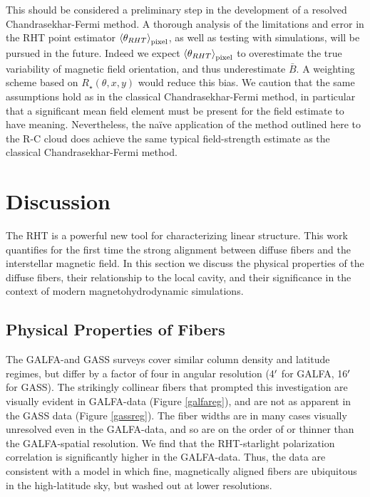 This should be considered a preliminary step in the development of a resolved Chandrasekhar-Fermi method. A thorough analysis of the limitations and error in the RHT point estimator $\left<\theta_{RHT}\right>_{\rm pixel}$, as well as testing with simulations, will be pursued in the future. Indeed we expect $\left<\theta_{RHT}\right>_{\rm pixel}$ to overestimate the true variability of magnetic field orientation, and thus underestimate $\bar{B}$. A weighting scheme based on $R_\star\left(\theta, x, y\right)$ would reduce this bias. We caution that the same assumptions hold as in the classical Chandrasekhar-Fermi method, in particular that a significant mean field element must be present for the field estimate to have meaning. Nevertheless, the na\"ive application of the method outlined here to the R-C cloud does achieve the same typical field-strength estimate as the classical Chandrasekhar-Fermi method.

\section{Discussion}\label{discussion}
The RHT is a powerful new tool for characterizing linear structure. This work quantifies for the first time the strong alignment between diffuse \hi fibers and the interstellar magnetic field. In this section we discuss the physical properties of the diffuse fibers, their relationship to the local cavity, and their significance in the context of modern magnetohydrodynamic simulations.

\subsection{Physical Properties of Fibers}
The GALFA-\hi and GASS surveys cover similar column density and latitude regimes, but differ by a factor of four in angular resolution (4${\mbox{$^\prime$}}$ for GALFA, 16${\mbox{$^\prime$}}$ for GASS). The strikingly collinear \hi fibers that prompted this investigation are visually evident in GALFA-\hi data (Figure \ref{galfareg}), and are not as apparent in the GASS data (Figure \ref{gassreg}). The fiber widths are in many cases visually unresolved even in the GALFA-\hi data, and so are on the order of or thinner than the GALFA-\hi spatial resolution. We find that the RHT-starlight polarization correlation is significantly higher in the GALFA-\hi data. Thus, the data are consistent with a model in which fine, magnetically aligned \hi fibers are ubiquitous in the high-latitude sky, but washed out at lower resolutions. 

